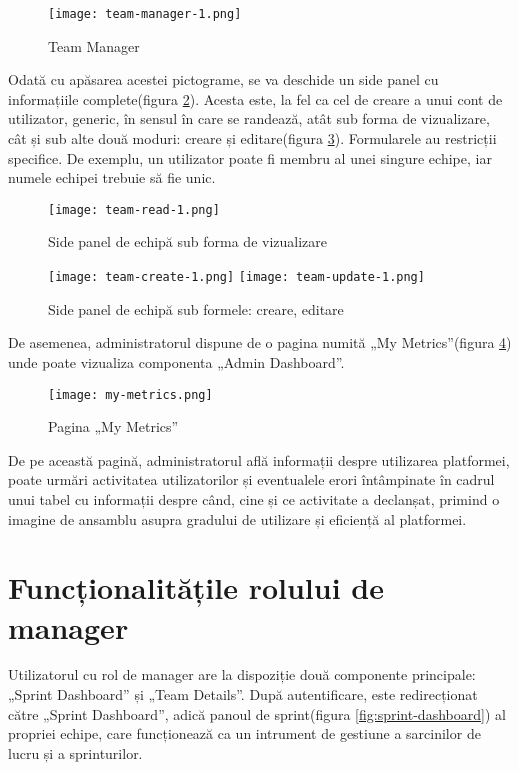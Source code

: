  \begin{figure}[H]
	\centering
 	 \texttt{[image: team-manager-1.png]}
	\caption{Team Manager}
	\label{fig:team-manager}
 \end{figure}

Odată cu apăsarea acestei pictograme, se va deschide un side panel cu informațiile complete(figura \ref{fig:team-panel-read}). Acesta este, la fel ca cel de creare a unui cont de utilizator, generic, în sensul în care se randează, atât sub forma de vizualizare, cât și sub alte două moduri: creare și editare(figura \ref{fig:team-panel}). Formularele au restricții specifice. De exemplu, un utilizator poate fi membru al unei singure echipe, iar numele echipei trebuie să fie unic.

 \begin{figure}[H]
	\centering
	\texttt{[image: team-read-1.png]}
	\caption{Side panel de echipă sub forma de vizualizare}
	\label{fig:team-panel-read}
 \end{figure}

 \begin{figure}[H]
 	 \texttt{[image: team-create-1.png]}
	\texttt{[image: team-update-1.png]}
	\caption{Side panel de echipă sub formele: creare, editare}
	\label{fig:team-panel}
 \end{figure}

De asemenea, administratorul dispune de o pagina numită „My Metrics”(figura \ref{fig:my-metrics}) unde poate vizualiza componenta „Admin Dashboard”.

 \begin{figure}[H]
	\centering
 	 \texttt{[image: my-metrics.png]}
	\caption{Pagina „My Metrics”}
	\label{fig:my-metrics}
 \end{figure}

De pe această pagină, administratorul află informații despre utilizarea platformei, poate urmări activitatea utilizatorilor și eventualele erori întâmpinate în cadrul unui tabel cu informații despre când, cine și ce activitate a declanșat, primind o imagine de ansamblu asupra gradului de utilizare și eficiență al platformei.

\section{Funcționalitățile rolului de manager}

Utilizatorul cu rol de manager are la dispoziție două componente principale: „Sprint Dashboard” și „Team Details”. După autentificare, este redirecționat către „Sprint Dashboard”, adică panoul de sprint(figura \ref{fig:sprint-dashboard}) al propriei echipe, care funcționează ca un intrument de gestiune a sarcinilor de lucru și a sprinturilor.

